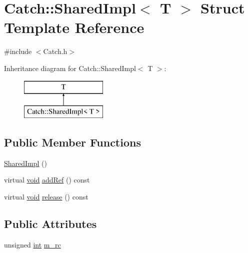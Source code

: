\hypertarget{struct_catch_1_1_shared_impl}{}\section{Catch\+:\+:Shared\+Impl$<$ T $>$ Struct Template Reference}
\label{struct_catch_1_1_shared_impl}


{\ttfamily \#include $<$Catch.\+h$>$}

Inheritance diagram for Catch\+:\+:Shared\+Impl$<$ T $>$\+:\begin{figure}[H]
\begin{center}
\leavevmode
\includegraphics[height=2.000000cm]{struct_catch_1_1_shared_impl}
\end{center}
\end{figure}
\subsection*{Public Member Functions}
\begin{DoxyCompactItemize}
\item 
\hyperlink{struct_catch_1_1_shared_impl_a0629856ee353298b61ad52cf60e716fb}{Shared\+Impl} ()
\item 
virtual \hyperlink{_s_d_l__opengles2__gl2ext_8h_ae5d8fa23ad07c48bb609509eae494c95}{void} \hyperlink{struct_catch_1_1_shared_impl_a9b190b7a139a09d2624d1201d8e4f87e}{add\+Ref} () const 
\item 
virtual \hyperlink{_s_d_l__opengles2__gl2ext_8h_ae5d8fa23ad07c48bb609509eae494c95}{void} \hyperlink{struct_catch_1_1_shared_impl_a16baad80ad5ad3dfaf2a10a157a02e01}{release} () const 
\end{DoxyCompactItemize}
\subsection*{Public Attributes}
\begin{DoxyCompactItemize}
\item 
unsigned \hyperlink{_s_d_l__thread_8h_a6a64f9be4433e4de6e2f2f548cf3c08e}{int} \hyperlink{struct_catch_1_1_shared_impl_a7e71ef1985b85aa41a1632f932a96bcb}{m\+\_\+rc}
\end{DoxyCompactItemize}


